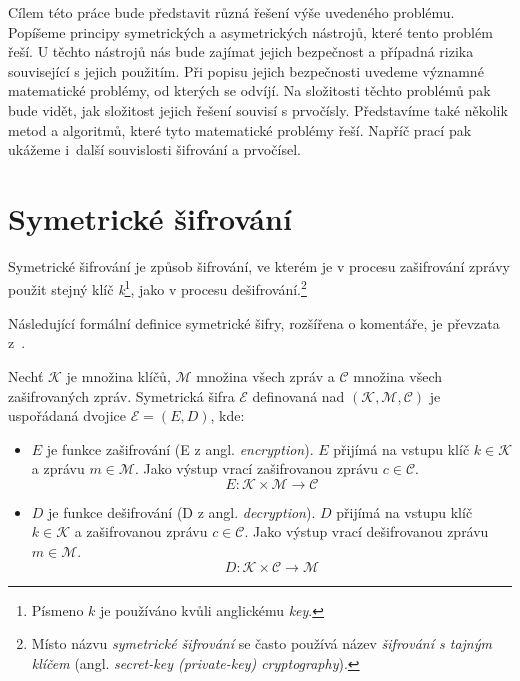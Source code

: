 \documentclass[
  program=infoi,
  biblatex=false,
  figures=true,
  glossaries,
  tables=false,
  sourcecodes=true,
  index
]{kidiplom}
\begin{document}
    Cílem této práce bude představit různá řešení výše uvedeného problému.
    Popíšeme principy symetrických a asymetrických nástrojů, které tento problém řeší.
    U těchto nástrojů nás bude zajímat jejich bezpečnost a případná rizika související s jejich použitím.
    Při popisu jejich bezpečnosti uvedeme významné matematické problémy, od kterých se odvíjí.
    Na složitosti těchto problémů pak bude vidět, jak složitost jejich řešení souvisí s prvočísly.
    Představíme také několik metod a algoritmů, které tyto matematické problémy řeší.
    Napříč prací pak ukážeme i~další souvislosti šifrování a prvočísel.


\newpage


\section{Symetrické šifrování}\label{sec:private-key}


    Symetrické šifrování je způsob šifrování, ve kterém je v procesu zašifrování zprávy použit
    stejný klíč \emph{k}\footnote{Písmeno $k$ je používáno kvůli anglickému \emph{key}.}, jako v procesu dešifrování.\footnote{Místo názvu
    \emph{symetrické šifrování} se často používá název \emph{šifrování s tajným klíčem} (angl. \emph{secret-key (private-key) cryptography}).}

    Následující formální definice symetrické šifry, rozšířena o komentáře, je převzata z~\cite{graduate-course}.

    \begin{definition}
        Nechť $\mathcal{K}$ je množina klíčů, $\mathcal{M}$ množina všech zpráv a $\mathcal{C}$ množina všech zašifrovaných zpráv.
        Symetrická šifra $\mathcal{E}$ definovaná nad $(\mathcal{K},\mathcal{M},\mathcal{C})$
        je uspořádaná dvojice $\mathcal{E}  = (E, D)$, kde:

        \begin{itemize}
            \item
                $E$ je funkce zašifrování (E z angl. \emph{encryption}).
                $E$ přijímá na vstupu klíč $k \in \mathcal{K}$ a zprávu $m \in \mathcal{M}$.
                Jako výstup vrací zašifrovanou zprávu $c \in \mathcal{C}$.
                \[
                    E: \mathcal{K} \times \mathcal{M} \rightarrow \mathcal{C}
                \]

            \item
                $D$ je funkce dešifrování (D z angl. \emph{decryption}).
                $D$ přijímá na vstupu klíč $k \in \mathcal{K}$
                a zašifrovanou zprávu $c \in \mathcal{C}$.
                Jako výstup vrací dešifrovanou zprávu $m \in \mathcal{M}$.
                \[
                    D: \mathcal{K} \times \mathcal{C} \rightarrow \mathcal{M}
                \]
        \end{itemize}
    \end{definition}
\end{document}
